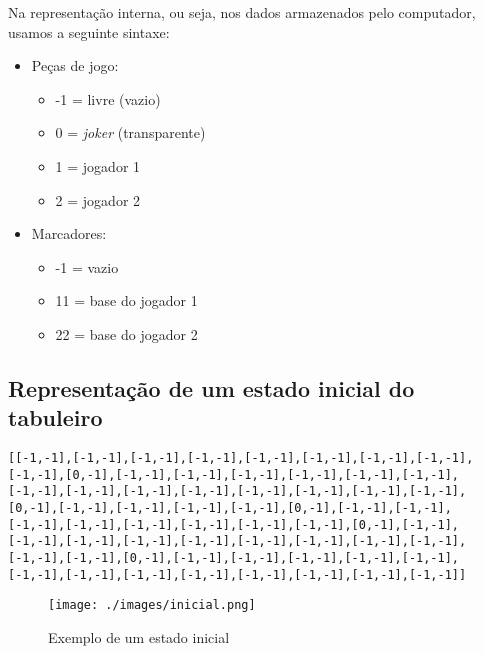 \documentclass[a4paper]{article}
\begin{document}
\begin{multicols}{2}
Na representação interna, ou seja, nos dados armazenados pelo computador, usamos a seguinte sintaxe:
\begin{itemize}
	\item Peças de jogo:
	\begin{itemize}
		\item -1 = livre (vazio)
		\item 0 = \textit{joker} (transparente)
		\item 1 = jogador 1
		\item 2 = jogador 2
	\end{itemize}
	\item Marcadores:
	\begin{itemize}
		\item -1 = vazio
		\item 11 = base do jogador 1
		\item 22 = base do jogador 2
	\end{itemize}
\end{itemize}

\end{multicols}

\subsection{Representação de um estado inicial do tabuleiro}

\begin{small}
\begin{lstlisting}
[[-1,-1],[-1,-1],[-1,-1],[-1,-1],[-1,-1],[-1,-1],[-1,-1],[-1,-1],
[-1,-1],[0,-1],[-1,-1],[-1,-1],[-1,-1],[-1,-1],[-1,-1],[-1,-1],
[-1,-1],[-1,-1],[-1,-1],[-1,-1],[-1,-1],[-1,-1],[-1,-1],[-1,-1],
[0,-1],[-1,-1],[-1,-1],[-1,-1],[-1,-1],[0,-1],[-1,-1],[-1,-1],
[-1,-1],[-1,-1],[-1,-1],[-1,-1],[-1,-1],[-1,-1],[0,-1],[-1,-1],
[-1,-1],[-1,-1],[-1,-1],[-1,-1],[-1,-1],[-1,-1],[-1,-1],[-1,-1],
[-1,-1],[-1,-1],[0,-1],[-1,-1],[-1,-1],[-1,-1],[-1,-1],[-1,-1],
[-1,-1],[-1,-1],[-1,-1],[-1,-1],[-1,-1],[-1,-1],[-1,-1],[-1,-1]]
\end{lstlisting}
\end{small}

\begin{figure}[h!]
	\begin{center}
		\texttt{[image: ./images/inicial.png]}
		\caption{Exemplo de um estado inicial}
		\label{fig:5}
	\end{center}
\end{figure}
\end{document}
